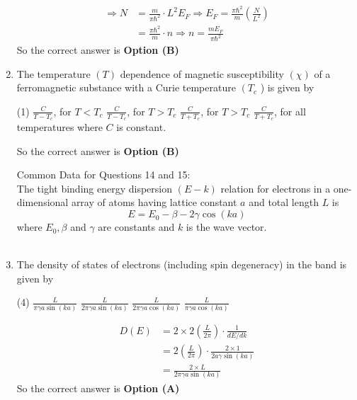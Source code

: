 \begin{enumerate}
\begin{answer}
\begin{align*}
		\Rightarrow N&=\frac{m}{\pi \hbar^{2}} \cdot L^{2} E_{F} \Rightarrow E_{F}=\frac{\pi \hbar^{2}}{m}\left(\frac{N}{L^{2}}\right)\\&=\frac{\pi \hbar^{2}}{m} \cdot n \Rightarrow n=\frac{m E_{F}}{\pi \hbar^{2}}
		\end{align*}
		So the correct answer is \textbf{Option (B)}
	\end{answer}
	\item The temperature $(T)$ dependence of magnetic susceptibility $(\chi)$ of a ferromagnetic substance with a Curie temperature $\left(T_{c}\right.$ ) is given by
	{	}
	\begin{tasks}(1)
		\task[\textbf{A.}]  $\frac{C}{T-T_{c}}$, for $T<T_{c}$
		\task[\textbf{B.}] $\frac{C}{T-T_{c}}$, for $T>T_{c}$
		\task[\textbf{C.}] $\frac{C}{T+T_{c}}$, for $T>T_{c}$
		\task[\textbf{D.}] $\frac{C}{T+T_{c}}$, for all temperatures
		where $C$ is constant.
	\end{tasks}
	\begin{answer}
		So the correct answer is \textbf{Option (B)}
	\end{answer}
	Common Data for Questions 14 and 15:\\
	The tight binding energy dispersion $(E-k)$ relation for electrons in a one-dimensional array of atoms having lattice constant $a$ and total length $L$ is
	$$
	E=E_{0}-\beta-2 \gamma \cos (k a)
	$$
	where $E_{0}, \beta$ and $\gamma$ are constants and $k$ is the wave vector.\\\\
	\item The density of states of electrons (including spin degeneracy) in the band is given by
	{	}
	\begin{tasks}(4)
		\task[\textbf{A.}] $\frac{L}{\pi \gamma a \sin (k a)}$
		\task[\textbf{B.}] $\frac{L}{2 \pi \gamma a \sin (k a)}$
		\task[\textbf{C.}] $\frac{L}{2 \pi \gamma a \cos (k a)}$
		\task[\textbf{D.}] $\frac{L}{\pi \gamma a \cos (k a)}$
	\end{tasks}
	\begin{answer}
		\begin{align*}
		D(E)&=2 \times 2\left(\frac{L}{2 \pi}\right) \cdot \frac{1}{d E / d k}\\&=2\left(\frac{L}{2 \pi}\right) \cdot \frac{2 \times 1}{2 a \gamma \sin (k a)}\\&=\frac{2 \times L}{2 \pi \gamma a \sin (k a)}
		\end{align*}
		So the correct answer is \textbf{Option (A)}
	\end{answer}

\end{enumerate}
